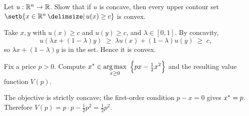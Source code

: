 
\begin{problem}
Let \(u : \mathbb{R}^{n} \to \mathbb{R}\). Show that if \(u\) is concave, then every upper contour set
\(\setb{x \in \R^{n} \given u(x) \ge c}\) is convex.
\end{problem}

\begin{solution}
Take \(x,y\) with \(u(x) \ge c\) and \(u(y) \ge c\), and \(\lambda \in [0,1]\).
By concavity,
\[
  u(\lambda x + (1-\lambda) y) \;\ge\; \lambda u(x) + (1-\lambda) u(y) \;\ge\; c ,
\]
so \(\lambda x + (1-\lambda) y\) is in the set. Hence it is convex.
\end{solution}

\begin{problem}
Fix a price \(p > 0\). Compute
\(\displaystyle x^{*} \in \operatorname*{arg\,max}_{x \ge 0}\ \Big\{ p x - \tfrac{1}{2} x^2 \Big\}\)
and the resulting value function \(V(p)\).
\end{problem}

\begin{solution}
The objective is strictly concave; the first-order condition \(p - x = 0\) gives
\(x^{*} = p\). Therefore \(V(p) = p\cdot p - \tfrac12 p^2 = \tfrac12 p^2\).
\end{solution}
